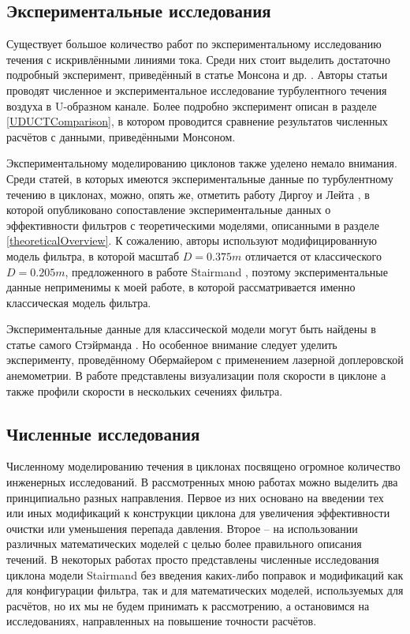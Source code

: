   
	\subsection{Экспериментальные исследования}
		\hspace{1em}Существует большое количество работ по экспериментальному исследованию течения с искривлёнными линиями тока. Среди них стоит выделить достаточно подробный эксперимент, приведённый в статье Монсона и др. \cite{Monson}. Авторы статьи проводят численное и экспериментальное исследование турбулентного течения воздуха в U-образном канале. Более подробно эксперимент описан в разделе \ref{UDUCTComparison}, в котором проводится сравнение результатов численных расчётов с данными, приведёнными Монсоном.
		
		Экспериментальному моделированию циклонов также уделено немало внимания. Среди статей, в которых имеются экспериментальные данные по турбулентному течению в циклонах, можно, опять же, отметить работу Диргоу и Лейта \cite{DirgoLeith}, в которой опубликовано сопоставление  экспериментальные данных о эффективности фильтров с теоретическими моделями, описанными в разделе \ref{theoreticalOverview}. К сожалению, авторы используют модифицированную модель фильтра, в которой масштаб $D = 0.375m$ отличается от классического $D = 0.205m$, предложенного в работе Stairmand \cite{Stairmand}, поэтому экспериментальные данные неприменимы к моей работе, в которой рассматривается именно классическая модель фильтра.
		
		Экспериментальные данные для классической модели могут быть найдены в статье самого Стэйрманда \cite{Stairmand}. Но особенное внимание следует уделить эксперименту, проведённому Обермайером \cite{Obermaier} с применением лазерной доплеровской анемометрии. В работе представлены визуализации поля скорости в циклоне а также профили скорости в нескольких сечениях фильтра.
	\subsection{Численные исследования}
		\hspace{2em}Численному моделированию течения в циклонах посвящено огромное количество инженерных исследований. В рассмотренных мною работах можно выделить два принципиально разных направления. Первое из них основано на введении тех или иных модификаций к конструкции циклона для увеличения эффективности очистки или уменьшения перепада давления. Второе -- на использовании различных математических моделей с целью более правильного описания течений. В некоторых работах просто представлены численные исследования циклона модели Stairmand без введения каких-либо поправок и модификаций как для конфигурации фильтра, так и для математических моделей, используемых для расчётов, но их мы не будем принимать к рассмотрению, а остановимся на исследованиях, направленных на повышение точности расчётов.
		
